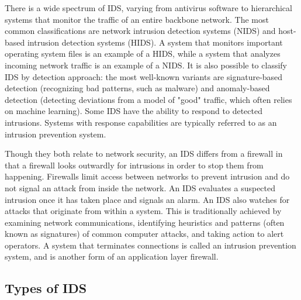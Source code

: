 \documentclass[12pt]{article}
\theoremstyle{definition}
\begin{document}
		There is a wide spectrum of IDS, varying from antivirus software to hierarchical systems that monitor the traffic of an entire backbone network. The most common classifications are network intrusion detection systems (NIDS) and host-based intrusion detection systems (HIDS). A system that monitors important operating system files is an example of a HIDS, while a system that analyzes incoming network traffic is an example of a NIDS. It is also possible to classify IDS by detection approach: the most well-known variants are signature-based detection (recognizing bad patterns, such as malware) and anomaly-based detection (detecting deviations from a model of "good" traffic, which often relies on machine learning). Some IDS have the ability to respond to detected intrusions. Systems with response capabilities are typically referred to as an intrusion prevention system.
		
		Though they both relate to network security, an IDS differs from a firewall in that a firewall looks outwardly for intrusions in order to stop them from happening. Firewalls limit access between networks to prevent intrusion and do not signal an attack from inside the network. An IDS evaluates a suspected intrusion once it has taken place and signals an alarm. An IDS also watches for attacks that originate from within a system. This is traditionally achieved by examining network communications, identifying heuristics and patterns (often known as signatures) of common computer attacks, and taking action to alert operators. A system that terminates connections is called an intrusion prevention system, and is another form of an application layer firewall.
		\subsection{Types of IDS}
\end{document}
